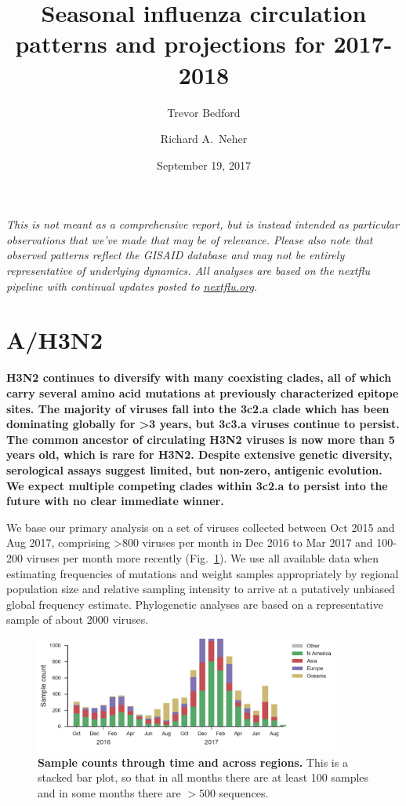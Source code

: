 \documentclass[11pt,oneside,letterpaper]{article}
\title{\vspace{2cm} \LARGE \bf
Seasonal influenza circulation patterns and projections for 2017-2018
}
\author[1]{Trevor Bedford}
\author[2]{Richard A.\ Neher}
\affil[1]{Vaccine and Infectious Disease Division, Fred Hutchinson Cancer Research Center, Seattle, WA, USA}
\affil[2]{Biozentrum, University of Basel, Basel, Switzerland}
\date{September 19, 2017}
\newcommand{\FIG}[1]{Fig.~\ref{#1}}
\begin{document}
\maketitle

\emph{This is not meant as a comprehensive report, but is instead
intended as particular observations that we've made that may be of
relevance. Please also note that observed patterns reflect the GISAID
database and may not be entirely representative of underlying dynamics.
All analyses are based on the nextflu pipeline \cite{neher2015nextflu}
with continual updates posted to \href{http://nextflu.org}{nextflu.org}.}

\tableofcontents

\pagebreak
\section*{A/H3N2}

\textbf{H3N2 continues to diversify with many coexisting clades, all of
which carry several amino acid mutations at previously characterized
epitope sites. The majority of viruses fall into the 3c2.a clade which has
been dominating globally for \textgreater{}3 years, but 3c3.a viruses
continue to persist. The common ancestor of circulating H3N2 viruses is
now more than 5 years old, which is rare for H3N2. Despite extensive
genetic diversity, serological assays suggest limited, but non-zero,
antigenic evolution. We expect multiple competing clades within 3c2.a to
persist into the future with no clear immediate winner.}

We base our primary analysis on a set of viruses collected between Oct
2015 and Aug 2017, comprising \textgreater{}800 viruses per month in Dec
2016 to Mar 2017 and 100-200 viruses per month more recently (\FIG{h3n2_counts}). We use all
available data when estimating frequencies of mutations and weight
samples appropriately by regional population size and relative sampling
intensity to arrive at a putatively unbiased global frequency estimate.
Phylogenetic analyses are based on a representative sample of about 2000
viruses.

\begin{figure}[H]
  \centering
  \includegraphics[width=0.9\textwidth]{../figures/sep-2017/h3n2_counts.png}
  \caption{\textbf{Sample counts through time and across regions.}
  This is a stacked bar plot, so that in all months there are at least 100 samples and in some months there are $>500$ sequences.
  }
  \label{h3n2_counts}
\end{figure}
\end{document}
